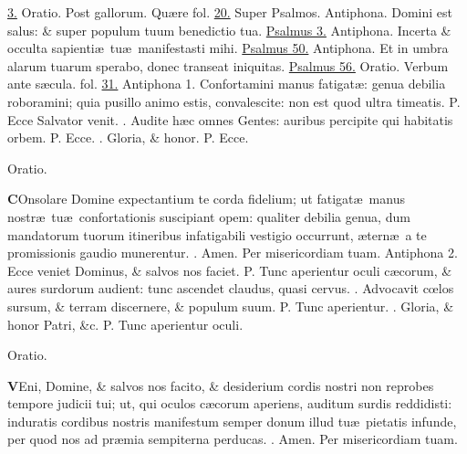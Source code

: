 \documentclass[letter,11pt]{book}
\makeatletter
\DeclareRobustCommand{\Vbar}{\vers@resp{-0.1em}{V}}
\DeclareRobustCommand{\Rbar}{\vers@resp{0pt}{R}}
\newcommand{\vers@resp@sym}{\raisebox{0.2ex}{\rotatebox[origin=c]{-20}{$\m@th\rceil$}}}
\newcommand{\vers@resp}[2]{%
  {\ooalign{\hidewidth\kern#1\vers@resp@sym\hidewidth\cr#2\cr}}%
}%
\def\P{\color{Red} P. \color{black}}
\def\V{\color{Red} \Vbar . \color{black}}
\def\R{\color{Red} \Rbar . \color{black}}
\makeatother
\begin{document}
\begin{multicols}{2}
\hyperlink{DOM-PRIMA-ADV-MAT}{3.} Oratio. Post gallorum. \color{Red} Qu\ae re fol. \color{black} \hyperlink{SUN-TERTIO-ADV-MAT}{20.} \color{Red} Super Psalmos. \color{black}
\newline \color{Red} Antiphona. \color{black} Domini est salus: \& super populum tuum benedictio tua. \color{Red} \hyperlink{ps3}{Psalmus 3.} \color{black}
\newline \color{Red} Antiphona. \color{black} Incerta \& occulta sapienti\ae \ tu\ae \ manifestasti mihi. \color{Red} \hyperlink{ps50}{Psalmus 50.} \color{black}
\newline \color{Red} Antiphona. \color{black} Et in umbra alarum tuarum sperabo, donec transeat iniquitas. \color{Red} \hyperlink{ps56}{Psalmus 56.} \color{black}
\newline \color{Red} Oratio. \color{black} Verbum ante s\ae cula. \color{Red} fol. \color{black} \hyperlink{DOM-QUINTO-ADV-MAT}{31.}
\newline \color{Red} Antiphona 1. \color{black} Confortamini manus fatigat\ae : genua debilia roboramini; quia pusillo animo estis, convalescite: non est quod ultra timeatis. \P Ecce Salvator venit. \V Audite h\ae c omnes Gentes: auribus percipite qui habitatis orbem. \P Ecce. \V Gloria, \& honor. \P Ecce.
\vspace{-.5em} \begin{center} \color{Red} Oratio. \color{black} \end{center} \vspace{-.5em}
\lettrine[lines=2]{\bfseries \color{Red} C}{}Onsolare Domine expectantium te corda fidelium; ut fatigat\ae \ manus nostr\ae \ tu\ae \ confortationis suscipiant opem: qualiter debilia genua, dum mandatorum tuorum itineribus infatigabili vestigio occurrunt, \ae tern\ae \ a te promissionis gaudio munerentur. \R Amen. Per misericordiam tuam.
\newline \color{Red} Antiphona 2. \color{black} Ecce veniet Dominus, \& salvos nos faciet. \P Tunc aperientur oculi c\ae corum, \& aures surdorum audient: tunc ascendet claudus, quasi cervus. \V Advocavit c\oe los sursum, \& terram discernere, \& populum suum. \P Tunc aperientur. \V Gloria, \& honor Patri, \&c. \P Tunc aperientur oculi.
\vspace{-.5em} \begin{center} \color{Red} Oratio. \color{black} \end{center} \vspace{-.5em}
\lettrine[lines=2]{\bfseries \color{Red} V}{}Eni, Domine, \& salvos nos facito, \& desiderium cordis nostri non reprobes tempore judicii tui; ut, qui oculos c\ae corum aperiens, auditum surdis reddidisti: induratis cordibus nostris manifestum semper donum illud tu\ae \ pietatis infunde, per quod nos ad pr\ae mia sempiterna perducas. \R Amen. Per misericordiam tuam.

\end{multicols}
\end{document}
